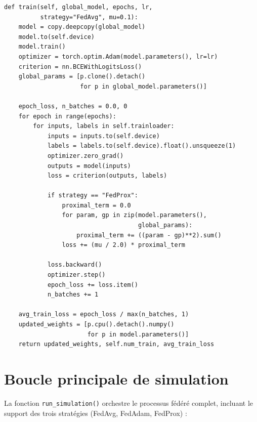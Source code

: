 \documentclass[12pt,a4paper]{report}
\begin{document}
\begin{lstlisting}[caption={M\'{e}thode d'entra\^{i}nement local avec support FedProx.},label={lst:train}]
def train(self, global_model, epochs, lr,
          strategy="FedAvg", mu=0.1):
    model = copy.deepcopy(global_model)
    model.to(self.device)
    model.train()
    optimizer = torch.optim.Adam(model.parameters(), lr=lr)
    criterion = nn.BCEWithLogitsLoss()
    global_params = [p.clone().detach()
                     for p in global_model.parameters()]

    epoch_loss, n_batches = 0.0, 0
    for epoch in range(epochs):
        for inputs, labels in self.trainloader:
            inputs = inputs.to(self.device)
            labels = labels.to(self.device).float().unsqueeze(1)
            optimizer.zero_grad()
            outputs = model(inputs)
            loss = criterion(outputs, labels)

            if strategy == "FedProx":
                proximal_term = 0.0
                for param, gp in zip(model.parameters(),
                                     global_params):
                    proximal_term += ((param - gp)**2).sum()
                loss += (mu / 2.0) * proximal_term

            loss.backward()
            optimizer.step()
            epoch_loss += loss.item()
            n_batches += 1

    avg_train_loss = epoch_loss / max(n_batches, 1)
    updated_weights = [p.cpu().detach().numpy()
                       for p in model.parameters()]
    return updated_weights, self.num_train, avg_train_loss
\end{lstlisting}

\section{Boucle principale de simulation}

La fonction \texttt{run\_simulation()} orchestre le processus f\'{e}d\'{e}r\'{e} complet, incluant le support des trois strat\'{e}gies (FedAvg, FedAdam, FedProx) :
\end{document}
